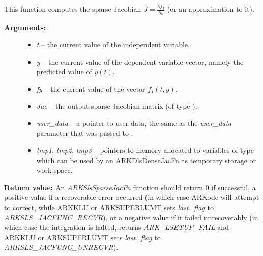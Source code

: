 \documentclass[letterpaper,10pt,english]{sphinxmanual}
\begin{document}
\begin{fulllineitems}
\label{c_interface/User_supplied:c.ARKSlsSparseJacFn}
This function computes the sparse Jacobian \(J =
\frac{\partial f_I}{\partial y}\) (or an approximation to it).
\begin{description}
\item[{\textbf{Arguments:}}] \leavevmode\begin{itemize}
\item {} 
\emph{t} -- the current value of the independent variable.

\item {} 
\emph{y} -- the current value of the dependent variable vector, namely
the predicted value of \(y(t)\).

\item {} 
\emph{fy} -- the current value of the vector \(f_I(t,y)\).

\item {} 
\emph{Jac} -- the output sparse Jacobian matrix (of type ).

\item {} 
\emph{user\_data} -- a pointer to user data, the same as the
\emph{user\_data} parameter that was passed to {\hyperref[c_interface/User_callable:c.ARKodeSetUserData]{\emph{}}}.

\item {} 
\emph{tmp1}, \emph{tmp2}, \emph{tmp3} -- pointers to memory allocated to
variables of type  which can be used by an
ARKDlsDenseJacFn as temporary storage or work space.

\end{itemize}

\end{description}

\textbf{Return value:}
An \emph{ARKSlsSparseJacFn} function should return 0 if
successful, a positive value if a recoverable error occurred (in
which case ARKode will attempt to correct, while ARKKLU or ARKSUPERLUMT
sets \emph{last\_flag} to \emph{ARKSLS\_JACFUNC\_RECVR}), or a negative
value if it failed unrecoverably (in which case the integration is
halted, {\hyperref[c_interface/User_callable:c.ARKode]{\emph{}}} returns \emph{ARK\_LSETUP\_FAIL} and
ARKKLU or ARKSUPERLUMT sets \emph{last\_flag} to \emph{ARKSLS\_JACFUNC\_UNRECVR}).


\end{fulllineitems}
\end{document}
